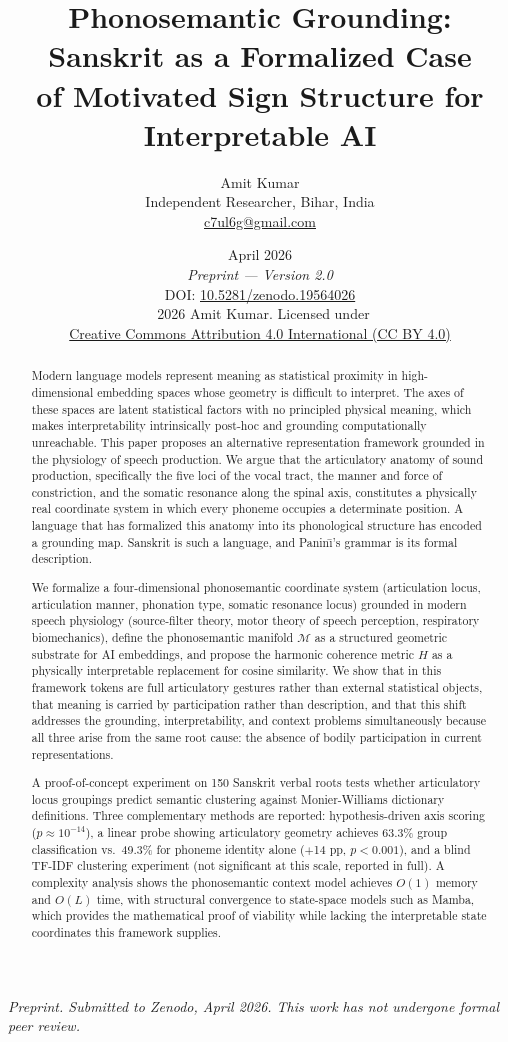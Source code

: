 \documentclass[12pt]{article}
\title{\textbf{Phonosemantic Grounding: Sanskrit as a Formalized Case\\
of Motivated Sign Structure for Interpretable AI}}
\author{Amit Kumar\\
\small Independent Researcher, Bihar, India\\
\small \href{mailto:c7ul6g@gmail.com}{c7ul6g@gmail.com}}
\date{%
  April 2026\\[4pt]
  \small\textit{Preprint — Version 2.0}\\[2pt]
  \small DOI: \href{https://doi.org/10.5281/zenodo.19564026}{10.5281/zenodo.19564026}\\[2pt]
  \small\textcopyright\ 2026 Amit Kumar. Licensed under\\
  \small\href{https://creativecommons.org/licenses/by/4.0/}{Creative Commons Attribution 4.0 International (CC BY 4.0)}%
}
\begin{document}
\maketitle

\begin{center}
\small\textit{Preprint. Submitted to Zenodo, April 2026. This work has not undergone formal peer review.}
\end{center}

\begin{abstract}
Modern language models represent meaning as statistical proximity in high-dimensional embedding spaces whose geometry is difficult to interpret. The axes of these spaces are latent statistical factors with no principled physical meaning, which makes interpretability intrinsically post-hoc and grounding computationally unreachable. This paper proposes an alternative representation framework grounded in the physiology of speech production. We argue that the articulatory anatomy of sound production, specifically the five loci of the vocal tract, the manner and force of constriction, and the somatic resonance along the spinal axis, constitutes a physically real coordinate system in which every phoneme occupies a determinate position. A language that has formalized this anatomy into its phonological structure has encoded a grounding map. Sanskrit is such a language, and Panin\={\i}'s grammar is its formal description.

We formalize a four-dimensional phonosemantic coordinate system (articulation locus, articulation manner, phonation type, somatic resonance locus) grounded in modern speech physiology (source-filter theory, motor theory of speech perception, respiratory biomechanics), define the phonosemantic manifold $\mathcal{M}$ as a structured geometric substrate for AI embeddings, and propose the harmonic coherence metric $H$ as a physically interpretable replacement for cosine similarity. We show that in this framework tokens are full articulatory gestures rather than external statistical objects, that meaning is carried by participation rather than description, and that this shift addresses the grounding, interpretability, and context problems simultaneously because all three arise from the same root cause: the absence of bodily participation in current representations.

A proof-of-concept experiment on 150 Sanskrit verbal roots tests whether articulatory locus groupings predict semantic clustering against Monier-Williams dictionary definitions. Three complementary methods are reported: hypothesis-driven axis scoring ($p \approx 10^{-14}$), a linear probe showing articulatory geometry achieves 63.3\% group classification vs.\ 49.3\% for phoneme identity alone ($+$14 pp, $p < 0.001$), and a blind TF-IDF clustering experiment (not significant at this scale, reported in full). A complexity analysis shows the phonosemantic context model achieves $O(1)$ memory and $O(L)$ time, with structural convergence to state-space models such as Mamba, which provides the mathematical proof of viability while lacking the interpretable state coordinates this framework supplies.


\end{abstract}
\end{document}
